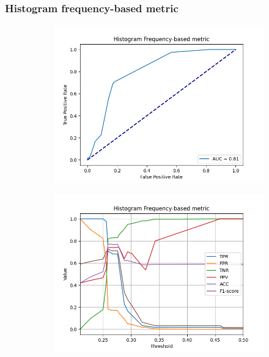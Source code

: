 \subsubsection{Histogram frequency-based metric}
\begin{figure}[H]
    \centering
    \begin{subfigure}[t]{0.48\textwidth}
        \includegraphics[width=\textwidth]{Figures/BlurredImages/results_on_thresholds/output_roc_hf.png}
        \caption{}
        \label{fig:HF_roc}
    \end{subfigure}\hspace{1em}
    \begin{subfigure}[t]{0.48\textwidth}
        \includegraphics[width=\textwidth]{Figures/BlurredImages/results_on_thresholds/threshold_test_scores_hf.png}

\end{subfigure}
\end{figure}
